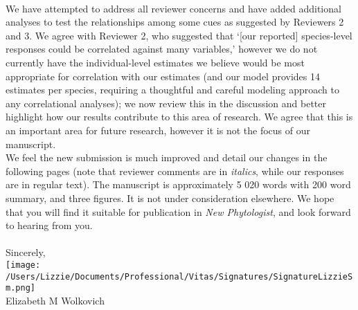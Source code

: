 \documentclass[11pt,a4paper]{letter}
\begin{document}
\begin{letter}{}
\vspace{1.5ex}\\
We have attempted to address all reviewer concerns and have added additional analyses to test the relationships among some cues as suggested by Reviewers 2 and 3.  We agree with Reviewer 2, who suggested that `[our reported] species-level responses could be correlated against many variables,' however we do not currently have the individual-level estimates we believe would be most appropriate for correlation with our estimates (and our model provides 14 estimates per species, requiring a thoughtful and careful modeling approach to any correlational analyses); we now review this in the discussion and better highlight how our results contribute to this area of research. We agree that this is an important area for future research, however it is not the focus of our manuscript. 
\vspace{1.5ex}\\
We feel the new submission is much improved and detail our changes in the following pages (note that reviewer comments are in \emph{italics}, while our responses are in regular text). The manuscript is approximately 5 020 words with 200 word summary, and three figures. It is not under consideration elsewhere. We hope that you will find it suitable for publication in \emph{New Phytologist}, and look forward to hearing from you.
\\\vspace{-1ex}\\
\noindent Sincerely,\\

 \texttt{[image: /Users/Lizzie/Documents/Professional/Vitas/Signatures/SignatureLizzieSm.png]} \\

\noindent Elizabeth M Wolkovich

\end{letter}
\end{document}
